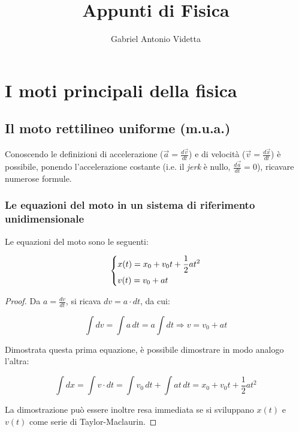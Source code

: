 \documentclass[oneside]{book}
\begin{document}
\author{Gabriel Antonio Videtta}
\title{Appunti di Fisica}

\maketitle

\tableofcontents

\chapter{I moti principali della fisica}

\section{Il moto rettilineo uniforme (m.u.a.)}

Conoscendo le definizioni di accelerazione ($\vec{a} = \frac{d\vec{v}}{dt}$)
e di velocità ($\vec{v} = \frac{d\vec{x}}{dt}$) è possibile, ponendo l'accelerazione
costante (i.e. il \textit{jerk} è nullo, $\frac{d\vec{a}}{dt} = 0$), ricavare numerose formule.

\subsection{Le equazioni del moto in un sistema di riferimento unidimensionale}

Le equazioni del moto sono le seguenti:

\begin{equation}
    \begin{dcases}
        x(t)=x_0+v_0t+\frac{1}{2}at^2 \\
        v(t)=v_0+at
    \end{dcases}
\end{equation}

\begin{proof}
    Da $a=\frac{dv}{dt}$, si ricava $dv=a\cdot dt$, da cui:

    \begin{equation*}
        \int dv=\int a\, dt = a \int dt \Rightarrow v=v_0+at
    \end{equation*}

    Dimostrata questa prima equazione, è possibile dimostrare in modo analogo l'altra:

    \begin{equation*}
        \int dx=\int v\cdot dt = \int v_0\, dt + \int at\, dt = x_0+v_0t+\frac12at^2
    \end{equation*}

    La dimostrazione può essere inoltre resa immediata se si sviluppano $x(t)$ e
    $v(t)$ come serie di Taylor-Maclaurin.

\end{proof}
\end{document}
